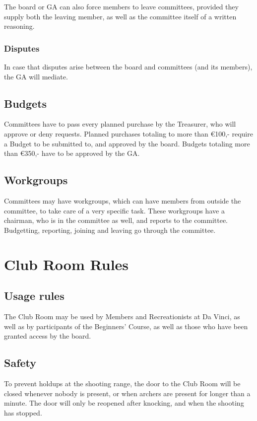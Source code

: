 \documentclass[a4paper]{article}
\begin{document}
The board or GA can also force members to leave committees, provided they supply both the leaving member, as well as the committee itself of a written reasoning.

\subsubsection{Disputes}
In case that disputes arise between the board and committees (and its members), the GA will mediate.

\subsection{Budgets}
Committees have to pass every planned purchase by the Treasurer, who will approve or deny requests. Planned purchases totaling to more than €100,- require a Budget to be submitted to, and approved by the board. Budgets totaling more than €350,- have to be approved by the GA.

\subsection{Workgroups}
Committees may have workgroups, which can have members from outside the committee, to take care of a very specific task. These workgroups have a chairman, who is in the committee as well, and reports to the committee. Budgetting, reporting, joining and leaving go through the committee.

\section{Club Room Rules}
\subsection{Usage rules}
The Club Room may be used by Members and Recreationists at Da Vinci, as well as by participants of the Beginners' Course, as well as those who have been granted access by the board. 

\subsection{Safety}
To prevent holdups at the shooting range, the door to the Club Room will be closed whenever nobody is present, or when archers are present for longer than a minute. The door will only be reopened after knocking, and when the shooting has stopped.
\end{document}
